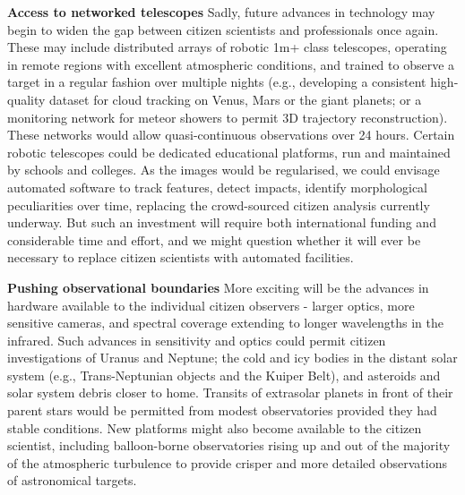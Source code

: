 \documentclass{ar2e}
\begin{document}
\begin{description}

\item{\bf Access to networked telescopes}
Sadly, future advances in technology may begin to widen the gap between
citizen scientists and professionals once again. These may include distributed
arrays of robotic 1m+ class telescopes, operating in remote regions with
excellent atmospheric conditions, and trained to observe a target in a regular
fashion over multiple nights (e.g., developing a consistent high-quality
dataset for cloud tracking on Venus, Mars or the giant planets; or a
monitoring network for meteor showers to permit 3D trajectory
reconstruction).  These networks would allow quasi-continuous observations
over 24 hours.  Certain robotic telescopes could be dedicated educational
platforms, run and maintained by schools and colleges.  As the images would be
regularised, we could envisage automated software to track features, detect
impacts, identify morphological peculiarities over time, replacing the
crowd-sourced citizen analysis currently underway.  But such an investment
will require both international funding and considerable time and effort, and
we might question whether it will ever be necessary to replace citizen
scientists with automated facilities.

\item{\bf Pushing observational boundaries}
More exciting will be the advances in hardware available to the individual
citizen observers - larger optics, more sensitive cameras, and spectral
coverage extending to longer wavelengths in the infrared.  Such advances in
sensitivity and optics could permit citizen investigations of Uranus and
Neptune; the cold and icy bodies in the distant solar system (e.g.,
Trans-Neptunian objects and the Kuiper Belt), and asteroids and solar system
debris closer to home.  Transits of extrasolar planets in front of their
parent stars would be permitted from modest observatories provided they had
stable conditions.  New platforms might also become available to the citizen
scientist, including balloon-borne observatories rising up and out of the
majority of the atmospheric turbulence to provide crisper and more detailed
observations of astronomical targets. 




\end{description}
\end{document}
